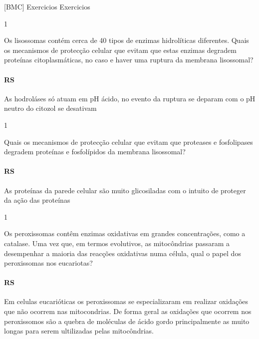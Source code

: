 \documentclass[\mainfilename]{subfiles}
\begin{document}
[BMC]
{Exercicios}
{Exercicios}

\begin{questionBox}1{}
    
    Os lisossomas contém cerca de 40 tipos de enzimas hidrolíticas diferentes. Quais os mecanismos de protecção celular que evitam que estas enzimas degradem proteínas citoplasmáticas, no caso e haver uma ruptura da membrana lisossomal?

    \paragraph*{RS} As hodroláses só atuam em pH ácido, no evento da ruptura se deparam com o pH neutro do citozol se desativam
    
\end{questionBox}

\begin{questionBox}1{}
    
    Quais os mecanismos de protecção celular que evitam que proteases e fosfolipases degradem proteínas e fosfolípidos da membrana lisossomal?

    \paragraph*{RS}
    As proteínas da parede celular são muito glicosiladas com o intuito de proteger da ação das proteínas
    
\end{questionBox}

\begin{questionBox}1{}
    
    Os peroxissomas contêm enzimas oxidativas em grandes concentrações, como a catalase. Uma vez que, em termos evolutivos, as mitocôndrias passaram a desempenhar a maioria das reacções oxidativas numa célula, qual o papel dos peroxissomas nos eucariotas?

    \paragraph*{RS}
    Em celulas eucarióticas os peroxissomas se especializaram em realizar oxidações que não ocorrem nas mitocondrias.
    De forma geral as oxidações que ocorrem nos peroxissomos são a quebra de moléculas de ácido gordo principalmente as muito longas para serem ultilizadas pelas mitocôndrias.
    
\end{questionBox}
\end{document}
